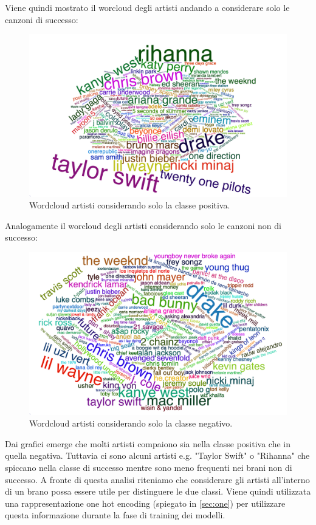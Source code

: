 Viene quindi mostrato il worcloud degli artisti andando a considerare
solo le canzoni di successo:

\begin{figure}[H]
	\centering
	\includegraphics[width=14cm]{../images/wordcloud_positive_fix.png}
	\caption{Wordcloud artisti considerando solo la classe positiva.}
\end{figure}

Analogamente il worcloud degli artisti considerando solo le canzoni
non di successo:

\begin{figure}[H]
	\centering
	\includegraphics[width=14cm]{../images/wordcloud_negative_fix.png}
	\caption{Wordcloud artisti considerando solo la classe negativo.}
\end{figure}

Dai grafici emerge che molti artisti compaiono sia nella classe
positiva che in quella negativa. Tuttavia ci sono alcuni artisti
e.g. "Taylor Swift" o "Rihanna" che spiccano nella classe di successo
mentre sono meno frequenti nei brani non di successo. A fronte di
questa analisi riteniamo che considerare gli artisti all'interno di un
brano possa essere utile per distinguere le due classi. Viene quindi
utilizzata una rappresentazione one hot encoding (spiegato in
\autoref{sec:one}) per utilizzare questa informazione durante la fase
di training dei modelli.


